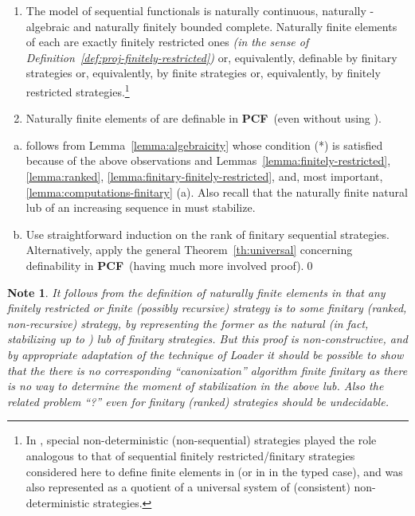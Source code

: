 \documentclass[fleqn]{LMCS}
\theoremstyle{plain}\newtheorem{satz}[thm]{Satz}
\theoremstyle{plain}\newtheorem{hyp}[thm]{Hypothesis}
\theoremstyle{plain}\newtheorem{hyps}[thm]{Hypotheses}
\theoremstyle{definition}\newtheorem{note}[thm]{Note}
\newcommand{\PCF}{\mbox{\bf PCF}}
\newcommand{\?}{\mbox{?}}
\begin{document}
\begin{thm}\label{th:continuity}\hfill
\begin{enumerate}[\em(a)]
\item The model of sequential functionals  
is naturally continuous, 
naturally -algebraic and naturally finitely bounded complete. 
Naturally finite elements of each  are exactly 
finitely restricted ones\/ {\em(in the sense of Definition~\ref{def:proj-finitely-restricted})} 
or, equivalently, definable 
by finitary strategies or, equivalently, 
by finite strategies or, equivalently, 
by finitely restricted strategies.\footnote{In \cite{Saz76SMZH}, special non-deterministic (non-sequential) 
strategies  played the role analogous to that of 
sequential finitely restricted/finitary strategies considered here 
to define finite elements in  (or in  in the 
typed case), and  was also represented as a quotient of a universal 
system of (consistent) non-deterministic strategies. 
}
\item Naturally finite elements of  are definable in 
\PCF\ (even without using ). 
\end{enumerate}
\end{thm}

\proof\hfill
\begin{enumerate}[(a)]
\item follows from Lemma~\ref{lemma:algebraicity} whose condition (*) 
is satisfied because of the above observations and  
Lemmas~\ref{lemma:finitely-restricted}, \ref{lemma:ranked}, 
\ref{lemma:finitary-finitely-restricted}, and, most important, 
\ref{lemma:computations-finitary} (a).
Also recall that the naturally finite natural lub of an increasing sequence 
in  must stabilize. 

\item Use straightforward induction on the rank of finitary sequential strategies.  
Alternatively, apply the general Theorem~\ref{th:universal} concerning definability 
in \PCF\ (having much more involved proof).\qed
\end{enumerate}



\begin{note}\label{note:finite-simeq-finitary}\em
It follows from the definition of naturally finite elements in  
that any finitely restricted or finite 
(possibly recursive) strategy is  
to some finitary (ranked, non-recursive) strategy, by representing the former as  
the natural (in fact, stabilizing up to ) lub of finitary strategies. 
But this proof is non-constructive, and by appropriate adaptation 
of the technique of Loader \cite{LoaderTCS2001} it should be possible to show that 
the \emph{there is no corresponding ``canonization'' algorithm} 
finite  finitary as there is no way to determine the moment 
of stabilization in the above lub. Also the related \emph{problem ``?'' 
even for finitary (ranked) strategies should be undecidable}. 
\end{note}
\end{document}
